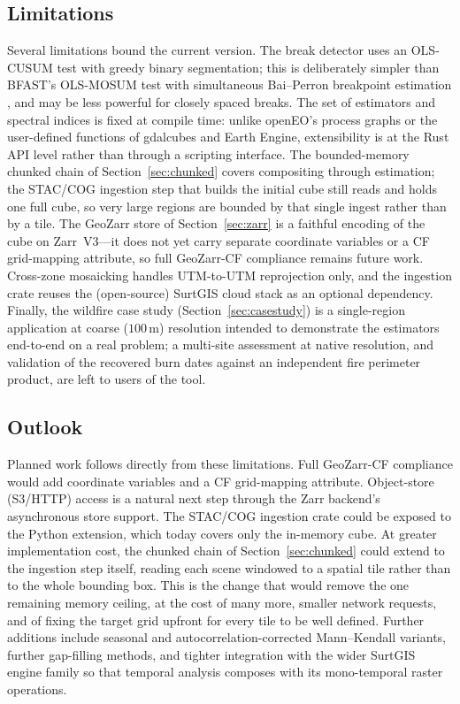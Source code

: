 \documentclass[review]{elsarticle}
\begin{document}
\subsection{Limitations}
\label{sec:limitations}
Several limitations bound the current version. The break detector uses an
OLS-CUSUM test with greedy binary segmentation; this is deliberately simpler than
BFAST's OLS-MOSUM test with simultaneous Bai--Perron breakpoint estimation
\citep{verbesselt2010bfast,baiperron2003}, and may be less powerful for closely
spaced breaks. The set of estimators and spectral indices is fixed at compile
time: unlike openEO's process graphs or the user-defined functions of gdalcubes
and Earth Engine, extensibility is at the Rust API level rather than through a
scripting interface. The bounded-memory chunked chain of
Section~\ref{sec:chunked} covers compositing through estimation; the STAC/COG
ingestion step that builds the initial cube still reads and holds one full
cube, so very large regions are bounded by that single ingest rather than by a
tile. The GeoZarr store of Section~\ref{sec:zarr} is a faithful encoding of the
cube on Zarr~V3---it does not yet carry separate coordinate variables or a
CF grid-mapping attribute, so full GeoZarr-CF compliance remains future work.
Cross-zone mosaicking handles UTM-to-UTM reprojection
only, and the ingestion crate reuses the (open-source) SurtGIS cloud stack as an
optional dependency. Finally, the wildfire case study
(Section~\ref{sec:casestudy}) is a single-region application at coarse
($100$\,m) resolution intended to demonstrate the estimators end-to-end on a
real problem; a multi-site assessment at native resolution, and validation of
the recovered burn dates against an independent fire perimeter product, are left
to users of the tool.

\subsection{Outlook}
\label{sec:outlook}
Planned work follows directly from these limitations. Full GeoZarr-CF
compliance would add coordinate variables and a CF grid-mapping attribute.
Object-store (S3/HTTP) access is a natural next step through the Zarr
backend's asynchronous store support. The STAC/COG ingestion crate could be
exposed to the Python extension, which today covers only the in-memory cube.
At greater implementation cost, the chunked chain of
Section~\ref{sec:chunked} could extend to the ingestion step itself, reading
each scene windowed to a spatial tile rather than to the whole bounding box.
This is the change that would remove the one remaining memory ceiling, at
the cost of many more, smaller network requests, and of fixing the target
grid upfront for every tile to be well defined. Further additions include
seasonal and autocorrelation-corrected Mann--Kendall variants, further
gap-filling methods, and tighter integration with the wider SurtGIS engine
family so that temporal analysis composes with its mono-temporal raster
operations.
\end{document}

